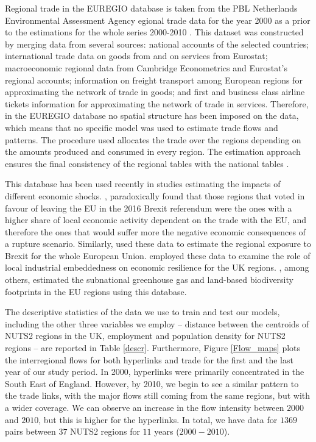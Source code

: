 \documentclass[]{interact}
\theoremstyle{plain}%
\theoremstyle{definition}
\theoremstyle{remark}
\begin{document}
Regional trade in the EUREGIO database is taken from the PBL Netherlands
Environmental Assessment Agency egional trade data for the year 2000 as
a prior to the estimations for the whole series 2000-2010 \citep[ and
\citet{thissen2013european}]{thissen2013integrated}. This dataset was
constructed by merging data from several sources: national accounts of
the selected countries; international trade data on goods from
\citep{feenstra2005world} and on services from Eurostat; macroeconomic
regional data from Cambridge Econometrics and Eurostat's regional
accounts; information on freight transport among European regions for
approximating the network of trade in goods; and first and business
class airline tickets information for approximating the network of trade
in services. Therefore, in the EUREGIO database no spatial structure has
been imposed on the data, which means that no specific model was used to
estimate trade flows and patterns. The procedure used allocates the
trade over the regions depending on the amounts produced and consumed in
every region. The estimation approach ensures the final consistency of
the regional tables with the national tables
\citep{thissen2018euregio, ivanova2019regional}.

This database has been used recently in studies estimating the impacts
of different economic shocks. \citet{los2017mismatch}, paradoxically
found that those regions that voted in favour of leaving the EU in the
2016 Brexit referendum were the ones with a higher share of local
economic activity dependent on the trade with the EU, and therefore the
ones that would suffer more the negative economic consequences of a
rupture scenario. Similarly, \citet{chen2018continental} used these data
to estimate the regional exposure to Brexit for the whole European
Union. \citet{kitsos2019role} employed these data to examine the role of
local industrial embeddedness on economic resilience for the UK regions.
\citet{wilting2020subnational}, among others, estimated the subnational
greenhouse gas and land-based biodiversity footprints in the EU regions
using this database.

The descriptive statistics of the data we use to train and test our
models, including the other three variables we employ -- distance
between the centroids of NUTS2 regions in the UK, employment and
population density for NUTS2 regions -- are reported in Table
\ref{descr}. Furthermore, Figure \ref{Flow_maps} plots the interregional
flows for both hyperlinks and trade for the first and the last year of
our study period. In 2000, hyperlinks were primarily concentrated in the
South East of England. However, by 2010, we begin to see a similar
pattern to the trade links, with the major flows still coming from the
same regions, but with a wider coverage. We can observe an increase in
the flow intensity between \(2000\) and \(2010\), but this is higher for
the hyperlinks. In total, we have data for \(1369\) pairs between \(37\)
NUTS2 regions for \(11\) years (\(2000-2010\)).
\end{document}
